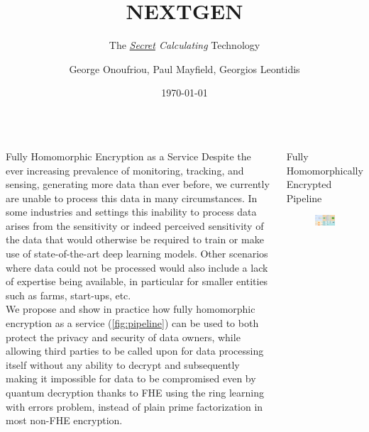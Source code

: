 \documentclass{beamer}
\title[NEXTGEN]{NEXTGEN}
\subtitle{The \textit{\href{https://cryptolog.io}{Secret} Calculating} Technology}
\author[\href{https://nextgen.abdn.ac.uk}{nextgen.abdn.ac.uk} or \href{https://cryptolog.io}{cryptolog.io}]{George Onoufriou, Paul Mayfield, Georgios Leontidis}
\date{\today}
\begin{document}
  \begin{frame}
    \maketitle
    \begin{columns}
      \begin{column}{0.3\textwidth}
        \begin{block}{Fully Homomorphic Encryption as a Service}
          Despite the ever increasing prevalence of monitoring, tracking, and sensing, generating more data than ever before, we currently are unable to process this data in many circumstances. In some industries and settings this inability to process data arises from the sensitivity or indeed perceived sensitivity of the data that would otherwise be required to train or make use of state-of-the-art deep learning models. Other scenarios where data could not be processed would also include a lack of expertise being available, in particular for smaller entities such as farms, start-ups, etc. \\
          We propose and show in practice how fully homomorphic encryption as a service (\ref{fig:pipeline}) can be used to both protect the privacy and security of data owners, while allowing third parties to be called upon for data processing itself without any ability to decrypt \autocite{gentry2009fully} and subsequently making it impossible for data to be compromised even by quantum decryption thanks to FHE using the ring learning with errors problem, instead of plain prime factorization in most non-FHE encryption.
        \end{block}
      \end{column}
      \begin{column}{0.35\textwidth}
        \begin{block}{Fully Homomorphically Encrypted Pipeline}
          \begin{figure}
            \centering
            \includegraphics[width=\textwidth]{nextgen.png}

\end{figure}
\end{block}
\end{column}
\end{columns}
\end{frame}
\end{document}
